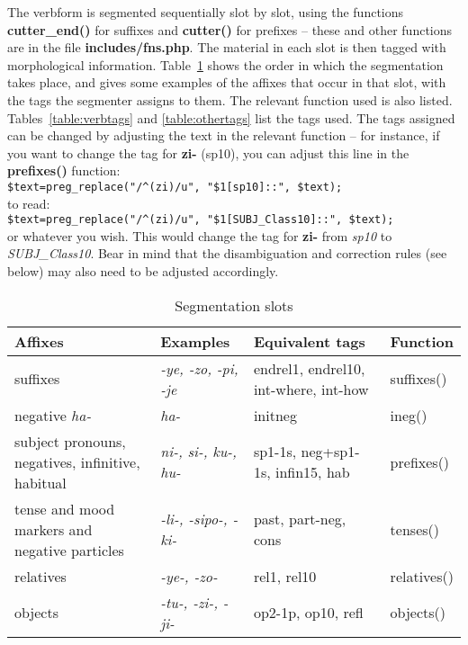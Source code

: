 \documentclass[a4paper,10pt]{article}
\begin{document}
The verbform is segmented sequentially slot by slot, using the functions \textbf{cutter\_end()} for suffixes and \textbf{cutter()} for prefixes -- these and other functions are in the file \textbf{includes/fns.php}.  The material in each slot is then tagged with morphological information.  Table~\ref{table:segslots} shows the order in which the segmentation takes place, and gives some examples of the affixes that occur in that slot, with the tags the segmenter assigns to them.  The relevant function used is also listed.  Tables~\ref{table:verbtags} and \ref{table:othertags} list the tags used.  The tags assigned can be changed by adjusting the text in the relevant function -- for instance, if you want to change the tag for \textbf{zi-} (sp10), you can adjust this line in the \textbf{prefixes()} function:\\
\verb|$text=preg_replace("/^(zi)/u", "$1[sp10]::", $text);|\\
to read:\\
\verb|$text=preg_replace("/^(zi)/u", "$1[SUBJ_Class10]::", $text);|\\
or whatever you wish.  This would change the tag for \textbf{zi-} from \textit{sp10} to \textit{SUBJ\_\-Class10}.  Bear in mind that the disambiguation and correction rules (see below) may also need to be adjusted accordingly.

\begin{table}
\begin{tabularx}{\textwidth}{>{\hsize=1.4\hsize}X>{\hsize=0.8\hsize}X>{\hsize=1.3\hsize}X>{\hsize=0.5\hsize}X} 
\textbf{Affixes} & \textbf{Examples} & \textbf{Equivalent tags} & \textbf{Function} \\
\hline\noalign{\smallskip}
suffixes & \textit{-ye, -zo, -pi, \mbox{-je}} & endrel1, endrel10, int-where, int-how & suffixes() \\
\hline\noalign{\smallskip}
negative \textit{ha-} & \textit{ha-} & initneg & ineg() \\
\noalign{\smallskip}\hline\noalign{\smallskip}
subject pronouns, negatives, infinitive, habitual & \textit{ni-, si-, ku-, hu-} & sp1-1s, neg\-+sp1-1s, infin15, hab & prefixes() \\
\hline\noalign{\smallskip}
tense and mood markers and negative particles & \textit{-li-, -sipo-, \mbox{-ki-}} & past, part-neg, cons & tenses() \\
\hline\noalign{\smallskip}
relatives & \textit{-ye-, -zo-} & rel1, rel10 & relatives() \\
\noalign{\smallskip}\hline\noalign{\smallskip}
objects & \textit{-tu-, -zi-, -ji-} & op2-1p, op10, refl & objects()
\end{tabularx}
\caption{Segmentation slots}
\label{table:segslots}
\end{table}
\end{document}
